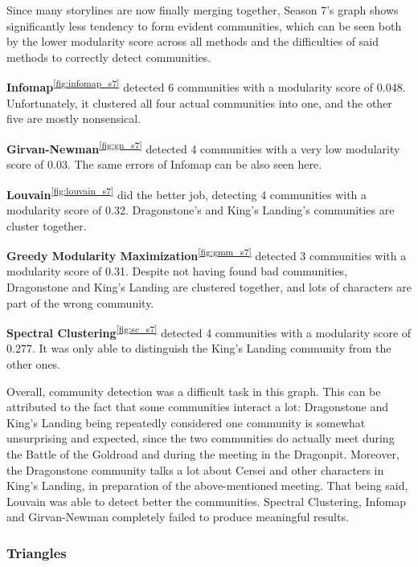 \documentclass[10pt,twocolumn,letterpaper]{article}
\begin{document}
Since many storylines are now finally merging together, Season 7's graph shows significantly less tendency to form evident communities, which can be seen both by the lower modularity score across all methods and the difficulties of said methods to correctly detect communities. 

\textbf{Infomap}\textsuperscript{\ref{fig:infomap_s7}} detected 6 communities with a modularity score of 0.048. Unfortunately, it clustered all four actual communities into one, and the other five are mostly nonsensical. 

\textbf{Girvan-Newman}\textsuperscript{\ref{fig:gn_s7}} detected 4 communities with a very low modularity score of 0.03. The same errors of Infomap can be also seen here.

\textbf{Louvain}\textsuperscript{\ref{fig:louvain_s7}} did the better job, detecting 4 communities with a modularity score of 0.32. Dragonstone's and King's Landing's communities are cluster together.

\textbf{Greedy Modularity Maximization}\textsuperscript{\ref{fig:gmm_s7}} detected 3 communities with a modularity score of 0.31. Despite not having found bad communities, Dragonstone and King's Landing are clustered together, and lots of characters are part of the wrong community.

\textbf{Spectral Clustering}\textsuperscript{\ref{fig:sc_s7}} detected 4 communities with a modularity score of 0.277. It was only able to distinguish the King's Landing community from the other ones.

Overall, community detection was a difficult task in this graph. This can be attributed to the fact that some communities interact a lot: Dragonstone and King's Landing being repeatedly considered one community is somewhat unsurprising and expected, since the two communities do actually meet during the Battle of the Goldroad and during the meeting in the Dragonpit. Moreover, the Dragonstone community talks a lot about Cersei and other characters in King's Landing, in preparation of the above-mentioned meeting. That being said, Louvain was able to detect better the communities. Spectral Clustering, Infomap and Girvan-Newman completely failed to produce meaningful results.


\subsubsection{Triangles}
\end{document}
